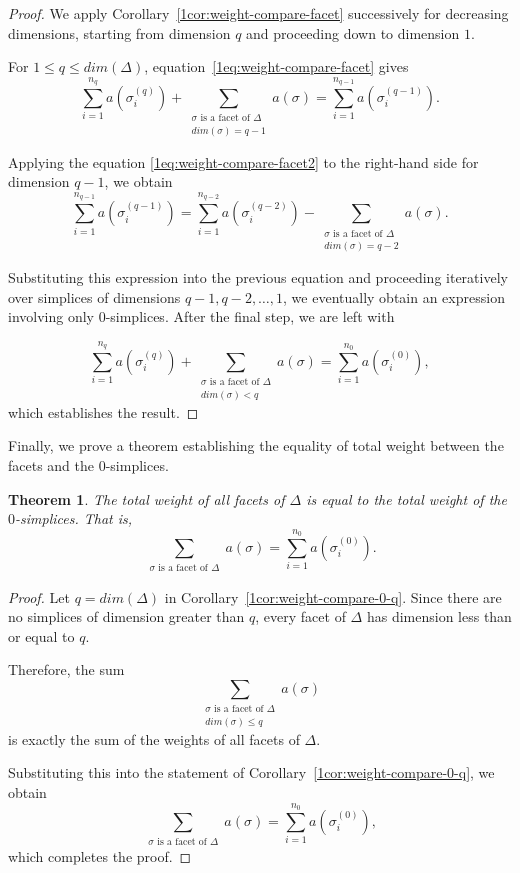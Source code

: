 \documentclass[12pt]{article}
\theoremstyle{normalhead_nobrackets}
\newtheorem{theorem}{Theorem}[section]
\theoremstyle{exampstyle}
\begin{document}
\begin{proof}
We apply Corollary~\ref{1cor:weight-compare-facet} successively for decreasing dimensions, starting from dimension $q$ and proceeding down to dimension $1$.

For $1\le q \le dim(\Delta)$, equation~\eqref{1eq:weight-compare-facet} gives
\[
\sum_{i=1}^{n_q} a(\sigma_i^{(q)}) 
+
\sum_{\substack{\sigma \text{ is a facet of } \Delta \\ dim(\sigma)=q-1}} a(\sigma)
=
\sum_{i=1}^{n_{q-1}} a(\sigma_i^{(q-1)}).
\]

Applying the equation \ref{1eq:weight-compare-facet2} to the right-hand side for dimension $q-1$, we obtain
\[
\sum_{i=1}^{n_{q-1}} a(\sigma_i^{(q-1)}) 
=
\sum_{i=1}^{n_{q-2}} a(\sigma_i^{(q-2)}) 
-
\sum_{\substack{\sigma \text{ is a facet of } \Delta \\ dim(\sigma)=q-2}} a(\sigma).
\]

Substituting this expression into the previous equation and proceeding iteratively over simplices of dimensions $q-1, q-2, \dots, 1$, we eventually obtain an expression involving only $0$-simplices. After the final step, we are left with

\[
\sum_{i=1}^{n_q} a(\sigma_i^{(q)})
+
\sum_{\substack{\sigma \text{ is a facet of } \Delta \\ dim(\sigma) < q}} a(\sigma)
=
\sum_{i=1}^{n_0} a(\sigma_i^{(0)}),
\]
which establishes the result.
\end{proof}

Finally, we prove a theorem establishing the equality of total weight between the facets and the $0$-simplices.


\begin{theorem}\label{1thm:facet-vertex-weight}
The total weight of all facets of $\Delta$ is equal to the total weight of the $0$-simplices. That is,
\[
\sum_{\substack{\sigma \text{ is a facet of } \Delta}} a(\sigma)
=
\sum_{i=1}^{n_0} a(\sigma_i^{(0)}).
\]
\end{theorem}

\begin{proof}
Let $q = dim(\Delta)$ in Corollary~\ref{1cor:weight-compare-0-q}. Since there are no simplices of dimension greater than $q$, every facet of $\Delta$ has dimension less than or equal to $q$.

Therefore, the sum
\[
\sum_{\substack{\sigma \text{ is a facet of } \Delta \\ dim(\sigma) \le q}} a(\sigma)
\]
is exactly the sum of the weights of all facets of $\Delta$.

Substituting this into the statement of Corollary~\ref{1cor:weight-compare-0-q}, we obtain
\[
\sum_{\substack{\sigma \text{ is a facet of } \Delta}} a(\sigma)
=
\sum_{i=1}^{n_0} a(\sigma_i^{(0)}),
\]
which completes the proof.
\end{proof}
\end{document}
